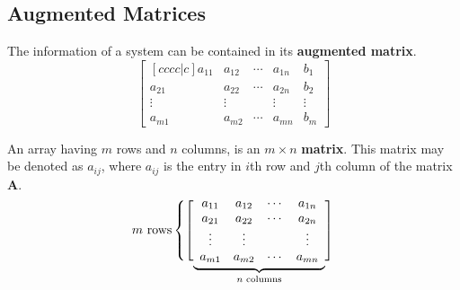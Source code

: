 \documentclass{article}
\begin{document}
\subsection{Augmented Matrices}
\begin{definition}
    The information of a system can be contained in its
    \textbf{augmented matrix}.
    \begin{equation*}
        \begin{bmatrix}[cccc|c]
            a_{11} & a_{12} & \cdots & a_{1n} & b_1    \\
            a_{21} & a_{22} & \cdots & a_{2n} & b_2    \\
            \vdots & \vdots &        & \vdots & \vdots \\
            a_{m1} & a_{m2} & \cdots & a_{mn} & b_m
        \end{bmatrix}
    \end{equation*}
\end{definition}
\begin{definition}
    An array having \(m\) rows and \(n\) columns, is an \(m \times n\)
    \textbf{matrix}. This matrix may be denoted as \(a_{ij}\), where
    \(a_{ij}\) is the entry in \(i\)th row and \(j\)th column of the
    matrix \(\symbf{A}\).
    \begin{equation*}
        \text{\(m\) rows}
        \left\{
        \left[
        \vphantom{\begin{array}{c} 1 \\ 1 \\ 1 \\ 1 \end{array}}
        \smash{\underbrace{
            \begin{array}{cccc}
                a_{11} & a_{12} & \cdots & a_{1n} \\
                a_{21} & a_{22} & \cdots & a_{2n} \\
                \vdots & \vdots &        & \vdots \\
                a_{m1} & a_{m2} & \cdots & a_{mn}
            \end{array}
        }_{\text{\(n\) columns}}}
        \right]
        \right.
    \end{equation*}
\end{definition}
\end{document}
